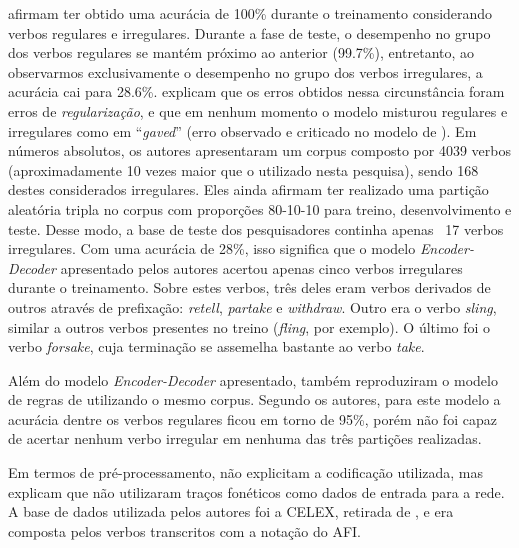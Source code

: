 \cite{kirov:2018} afirmam ter obtido uma acurácia de 100\% durante o treinamento considerando verbos regulares e irregulares. Durante a fase de teste, o desempenho no grupo dos verbos regulares se mantém próximo ao anterior (99.7\%), entretanto, ao observarmos exclusivamente o desempenho no grupo dos verbos irregulares, a acurácia cai para 28.6\%. \cite{kirov:2018} explicam que os erros obtidos nessa circunstância foram erros de \textit{regularização}, e que em nenhum momento o modelo misturou regulares e irregulares como em “\textit{gaved}” (erro observado e criticado no modelo de \cite{rumelhart:1986}). Em números absolutos, os autores apresentaram um corpus composto por 4039 verbos (aproximadamente 10 vezes maior que o utilizado nesta pesquisa), sendo 168 destes considerados irregulares. Eles ainda afirmam ter realizado uma partição aleatória tripla no corpus com proporções 80-10-10 para treino, desenvolvimento e teste. Desse modo, a base de teste dos pesquisadores continha apenas ~17 verbos irregulares. Com uma acurácia de 28\%, isso significa que o modelo \textit{Encoder-Decoder} apresentado pelos autores acertou apenas cinco verbos irregulares durante o treinamento. Sobre estes verbos, três deles eram verbos derivados de outros através de prefixação: \textit{retell}, \textit{partake} e \textit{withdraw}. Outro era o verbo \textit{sling}, similar a outros verbos presentes no treino (\textit{fling}, por exemplo). O último foi o verbo \textit{forsake}, cuja terminação se assemelha bastante ao verbo \textit{take}.

Além do modelo \textit{Encoder-Decoder} apresentado, \cite{kirov:2018} também reproduziram o modelo de regras de \cite{Albright2003RulesVA} utilizando o mesmo corpus. Segundo os autores, para este modelo a acurácia dentre os verbos regulares ficou em torno de 95\%, porém não foi capaz de acertar nenhum verbo irregular em nenhuma das três partições realizadas. 

Em termos de pré-processamento, \cite{kirov:2018}
não explicitam a codificação utilizada, mas explicam que não utilizaram traços fonéticos como dados de entrada para a rede. A base de dados utilizada pelos autores foi a CELEX, retirada de \cite{Baayen1993TheCL}, e era composta pelos verbos transcritos com a notação do AFI. 

